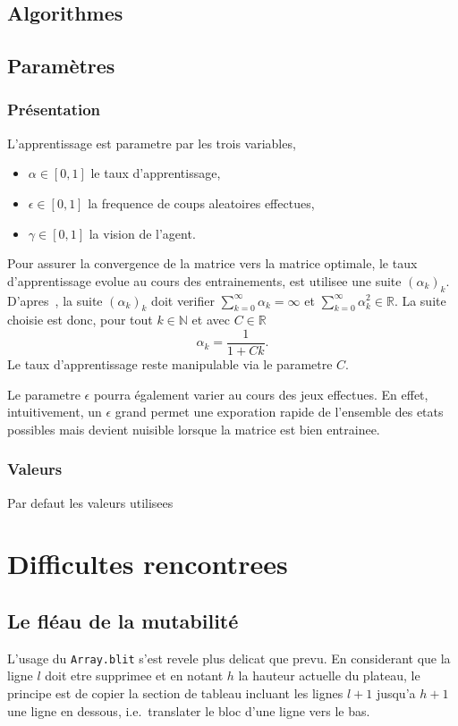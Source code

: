\documentclass{article}
\newcommand{\R}{\mathbb{R}}
\begin{document}
\subsection{Algorithmes}

\subsection{Param\`etres}
\subsubsection{Pr\'esentation}
L'apprentissage est parametre par les trois variables,
\begin{itemize}
  \item \(\alpha \in [0, 1]\) le taux d'apprentissage,
  \item \(\epsilon \in [0, 1]\) la frequence de coups aleatoires effectues,
  \item \(\gamma \in [0, 1]\) la vision de l'agent.
\end{itemize}

Pour assurer la convergence de la matrice vers la matrice optimale,
le taux d'apprentissage evolue au cours des entrainements, est utilisee une
suite \( (\alpha_k)_k \). D'apres~\cite{watkins92}, la suite \(
(\alpha_k)_k \) doit verifier \( \sum_{k=0}^\infty \alpha_k = \infty \) et \(
\sum_{k=0}^\infty \alpha_k^2 \in \R \). La suite choisie est donc, pour tout
\( k \in \mathbb{N} \) et avec \( C \in \R \)
\[
  \alpha_k = \frac{1}{1 + Ck}.
\]
Le taux d'apprentissage reste manipulable via le parametre \( C \).


Le parametre \(\epsilon\) pourra \'egalement varier au cours des jeux effectues.
En effet, intuitivement, un \(\epsilon\) grand permet une exporation rapide de
l'ensemble des etats possibles mais devient nuisible lorsque la matrice est bien
entrainee.

\subsubsection{Valeurs}
Par defaut les valeurs utilisees


\section{Difficultes rencontrees}

\subsection{Le fl\'eau de la mutabilit\'e}
L'usage du \texttt{Array.blit} s'est revele plus delicat que prevu. En
considerant que la ligne \(l\) doit etre supprimee et en notant \(h\) la hauteur
actuelle du plateau, le principe est de copier la section de tableau incluant
les lignes \(l+1\) jusqu'a \(h+1\) une ligne en dessous, i.e.\ translater le
bloc d'une ligne vers le bas.
\end{document}
